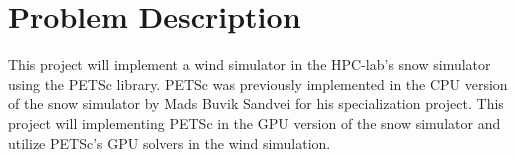 \section{Problem Description}

This project will implement a wind simulator in the HPC-lab's snow simulator 
using the PETSc library. PETSc was previously implemented in the CPU version
of the snow simulator by Mads Buvik Sandvei for his specialization project.
This project will implementing PETSc in the GPU version of the snow simulator
and utilize PETSc's GPU solvers in the wind simulation. 

